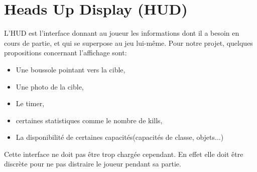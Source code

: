 \documentclass[../doc.tex]{subfiles}
\begin{document}
\section{Heads Up Display (HUD)}
L'HUD est l'interface donnant au joueur les informations dont il a besoin en cours de partie, et qui se superpose
au jeu lui-même.
Pour notre projet, quelques propositions concernant l'affichage sont:
\begin{itemize}
    \item Une boussole pointant vers la cible,
    \item Une photo de la cible,
    \item Le timer,
    \item certaines statistiques comme le nombre de kills,
    \item La disponibilité de certaines capacités(capacités de classe, objets...)
\end{itemize}


Cette interface ne doit pas être trop chargée cependant. En effet elle doit être discrète pour ne pas distraire le joueur pendant sa partie.
\end{document}
